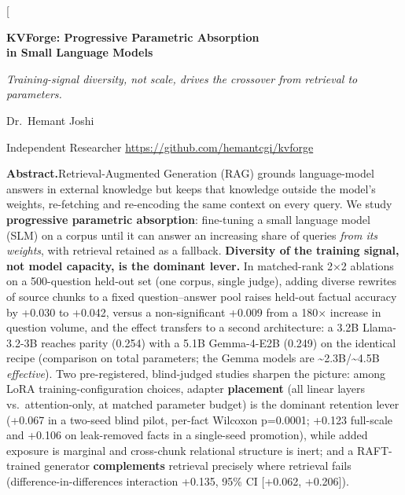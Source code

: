 \documentclass[10pt,twocolumn]{article}
\begin{document}
\twocolumn[{%
\begin{center}
{\LARGE\bfseries KVForge: Progressive Parametric Absorption\\[2pt] in Small Language Models\par}
\vspace{0.6em}
{\itshape Training-signal diversity, not scale, drives the crossover from retrieval to parameters.\par}
\vspace{0.9em}
{\large Dr.~Hemant Joshi\par}\vspace{0.25em}
{Independent Researcher \quad\textbullet\quad \url{https://github.com/hemantcgi/kvforge}\par}
\end{center}
\vspace{0.7em}
\begin{minipage}{\textwidth}
{\small\noindent\textbf{Abstract.}\quad Retrieval-Augmented Generation (RAG) grounds language-model answers in external knowledge but keeps that knowledge outside the model's weights, re-fetching and re-encoding the same context on every query. We study \textbf{progressive parametric absorption}: fine-tuning a small language model (SLM) on a corpus until it can answer an increasing share of queries \emph{from its weights}, with retrieval retained as a fallback. \textbf{Diversity of the training signal, not model capacity, is the dominant lever.} In matched-rank 2×2 ablations on a 500-question held-out set (one corpus, single judge), adding diverse rewrites of source chunks to a fixed question--answer pool raises held-out factual accuracy by +0.030 to +0.042, versus a non-significant +0.009 from a 180× increase in question volume, and the effect transfers to a second architecture: a 3.2B Llama-3.2-3B reaches parity (0.254) with a 5.1B Gemma-4-E2B (0.249) on the identical recipe (comparison on total parameters; the Gemma models are \textasciitilde2.3B/\textasciitilde4.5B \emph{effective}). Two pre-registered, blind-judged studies sharpen the picture: among LoRA training-configuration choices, adapter \textbf{placement} (all linear layers vs.~attention-only, at matched parameter budget) is the dominant retention lever (+0.067 in a two-seed blind pilot, per-fact Wilcoxon p=0.0001; +0.123 full-scale and +0.106 on leak-removed facts in a single-seed promotion), while added exposure is marginal and cross-chunk relational structure is inert; and a RAFT-trained generator \textbf{complements} retrieval precisely where retrieval fails (difference-in-differences interaction +0.135, 95\% CI {[}+0.062, +0.206{]}).

}
\end{minipage}}
\end{document}
